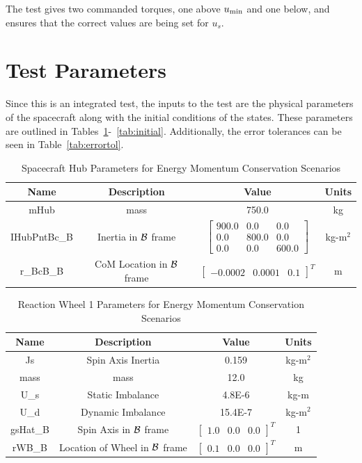 The test gives two commanded torques, one above $u_{\textnormal{min}}$ and one below, and ensures that the correct values are being set for $u_s$.

\section{Test Parameters}

Since this is an integrated test, the inputs to the test are the physical parameters of the spacecraft along with the initial conditions of the states. These parameters are outlined in Tables~\ref{tab:hub}-~\ref{tab:initial}. Additionally, the error tolerances can be seen in Table~\ref{tab:errortol}.

\begin{table}[htbp]
	\caption{Spacecraft Hub Parameters for Energy Momentum Conservation Scenarios}
	\label{tab:hub}
	\centering \fontsize{10}{10}\selectfont
	\begin{tabular}{ c | c | c | c } %
		\hline
		\textbf{Name}  & \textbf{Description}  & \textbf{Value} & \textbf{Units} \\
		\hline
		mHub  & mass & 750.0 & kg \\
		IHubPntBc\_B & Inertia in $\cal{B}$ frame & $\begin{bmatrix}
		900.0 & 0.0 & 0.0\\
		0.0 & 800.0 & 0.0\\
		0.0 & 0.0 & 600.0
		\end{bmatrix}$ & kg-m$^2$ \\
		r\_BcB\_B & CoM Location in $\cal{B}$ frame & $\begin{bmatrix}
		-0.0002 & 0.0001 & 0.1 \end{bmatrix}^T$ & m \\
		\hline
	\end{tabular}
\end{table}

\begin{table}[htbp]
	\caption{Reaction Wheel 1 Parameters for Energy Momentum Conservation Scenarios}
	\label{tab:rw1}
	\centering \fontsize{10}{10}\selectfont
	\begin{tabular}{ c | c | c | c } %
		\hline
		\textbf{Name}  & \textbf{Description}  & \textbf{Value} & \textbf{Units} \\
		\hline
		Js  & Spin Axis Inertia & 0.159 & kg-m$^2$ \\
		mass & mass & 12.0 & kg \\
		U\_s & Static Imbalance & 4.8E-6 & kg-m \\
		U\_d & Dynamic Imbalance & 15.4E-7 & kg-m$^2$ \\
		gsHat\_B & Spin Axis in $\cal{B}$ frame & $\begin{bmatrix}
		1.0 & 0.0 & 0.0 \end{bmatrix}^T$ & 1 \\
		rWB\_B & Location of Wheel in $\cal{B}$ frame & $\begin{bmatrix}
		0.1 & 0.0 & 0.0 \end{bmatrix}^T$ & m \\
		\hline
	\end{tabular}
\end{table}

